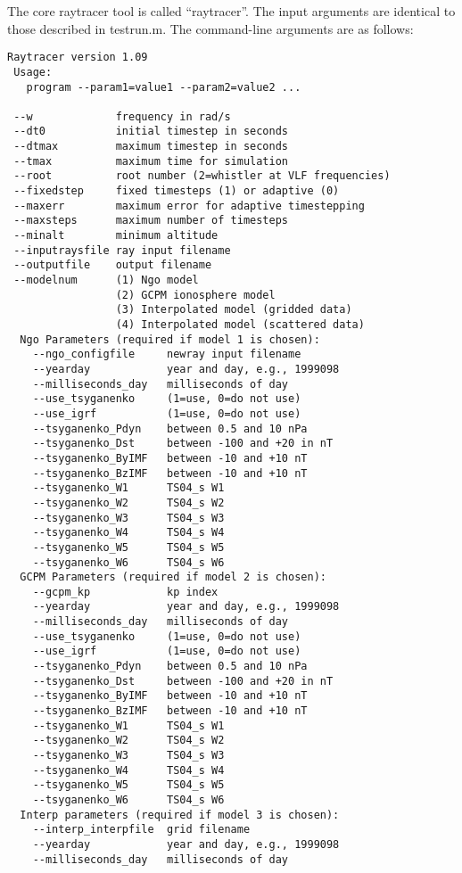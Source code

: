 \documentclass[10pt]{article}
\begin{document}
The core raytracer tool is called ``raytracer''.  The input arguments
are identical to those described in testrun.m.  The command-line
arguments are as follows:

\begin{verbatim}
Raytracer version 1.09
 Usage:
   program --param1=value1 --param2=value2 ...
   
 --w             frequency in rad/s
 --dt0           initial timestep in seconds
 --dtmax         maximum timestep in seconds
 --tmax          maximum time for simulation
 --root          root number (2=whistler at VLF frequencies)
 --fixedstep     fixed timesteps (1) or adaptive (0)
 --maxerr        maximum error for adaptive timestepping
 --maxsteps      maximum number of timesteps
 --minalt        minimum altitude
 --inputraysfile ray input filename
 --outputfile    output filename
 --modelnum      (1) Ngo model
                 (2) GCPM ionosphere model
                 (3) Interpolated model (gridded data)
                 (4) Interpolated model (scattered data)
  Ngo Parameters (required if model 1 is chosen):
    --ngo_configfile     newray input filename
    --yearday            year and day, e.g., 1999098
    --milliseconds_day   milliseconds of day
    --use_tsyganenko     (1=use, 0=do not use)
    --use_igrf           (1=use, 0=do not use)
    --tsyganenko_Pdyn    between 0.5 and 10 nPa
    --tsyganenko_Dst     between -100 and +20 in nT
    --tsyganenko_ByIMF   between -10 and +10 nT
    --tsyganenko_BzIMF   between -10 and +10 nT
    --tsyganenko_W1      TS04_s W1
    --tsyganenko_W2      TS04_s W2
    --tsyganenko_W3      TS04_s W3
    --tsyganenko_W4      TS04_s W4
    --tsyganenko_W5      TS04_s W5
    --tsyganenko_W6      TS04_s W6
  GCPM Parameters (required if model 2 is chosen):
    --gcpm_kp            kp index
    --yearday            year and day, e.g., 1999098
    --milliseconds_day   milliseconds of day
    --use_tsyganenko     (1=use, 0=do not use)
    --use_igrf           (1=use, 0=do not use)
    --tsyganenko_Pdyn    between 0.5 and 10 nPa
    --tsyganenko_Dst     between -100 and +20 in nT
    --tsyganenko_ByIMF   between -10 and +10 nT
    --tsyganenko_BzIMF   between -10 and +10 nT
    --tsyganenko_W1      TS04_s W1
    --tsyganenko_W2      TS04_s W2
    --tsyganenko_W3      TS04_s W3
    --tsyganenko_W4      TS04_s W4
    --tsyganenko_W5      TS04_s W5
    --tsyganenko_W6      TS04_s W6
  Interp parameters (required if model 3 is chosen):
    --interp_interpfile  grid filename
    --yearday            year and day, e.g., 1999098
    --milliseconds_day   milliseconds of day

\end{verbatim}
\end{document}
